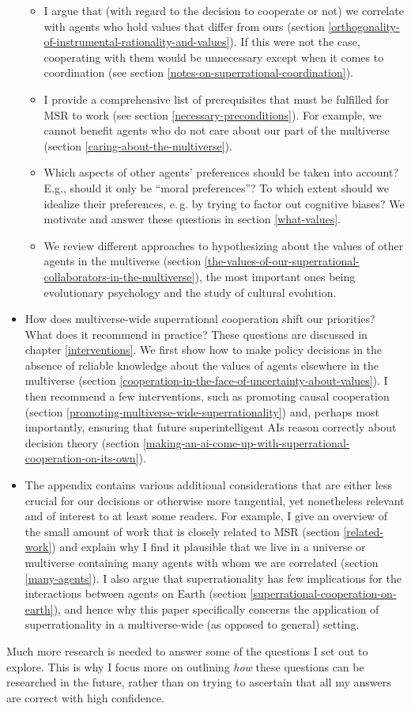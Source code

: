 \begin{itemize}
  \begin{itemize}
  \item
    I argue that (with regard to the decision to cooperate or not) we
    correlate with agents who hold values that differ from ours (section
    \ref{orthogonality-of-instrumental-rationality-and-values}). If this were not the
    case, cooperating with them would be unnecessary except when it
    comes to coordination (see section
    \ref{notes-on-superrational-coordination}).
  \item
    I provide a comprehensive list of prerequisites that must be
    fulfilled for MSR to work (see section
    \ref{necessary-preconditions}).
    For example, we cannot benefit agents who do not care about our part
    of the multiverse (section
    \ref{caring-about-the-multiverse}).
  \item
    Which aspects of other agents' preferences should be taken into
    account? E.g., should it only be ``moral preferences''? To which
    extent should we idealize their preferences, e.\,g. by trying to
    factor out cognitive biases? We motivate and answer these questions
    in section \ref{what-values}.
  \item
    We review different approaches to hypothesizing about the values of
    other agents in the multiverse (section
    \ref{the-values-of-our-superrational-collaborators-in-the-multiverse}),
    the most important ones being evolutionary psychology and the study
    of cultural evolution.
  \end{itemize}
\item
  How does multiverse-wide superrational cooperation shift our
  priorities? What does it recommend in practice? These questions are
  discussed in chapter
  \ref{interventions}. We first
  show how to make policy decisions in the absence of reliable knowledge
  about the values of agents elsewhere in the multiverse (section
  \ref{cooperation-in-the-face-of-uncertainty-about-values}). I then
  recommend a few interventions, such as promoting causal cooperation
  (section \ref{promoting-multiverse-wide-superrationality}) and, perhaps most importantly,
  ensuring that future superintelligent AIs reason correctly about
  decision theory (section
  \ref{making-an-ai-come-up-with-superrational-cooperation-on-its-own}).
\item
  The appendix contains various additional considerations that are
  either less crucial for our decisions or otherwise more tangential,
  yet nonetheless relevant and of interest to at least some readers. For
  example, I give an overview of the small amount of work that is
  closely related to MSR (section
  \ref{related-work}) and explain
  why I find it plausible that we live in a universe or multiverse
  containing many agents with whom we are correlated (section
  \ref{many-agents}). I also argue
  that superrationality has few implications for the interactions
  between agents on Earth (section
  \ref{superrational-cooperation-on-earth}), and hence why this paper specifically
  concerns the application of superrationality in a multiverse-wide (as
  opposed to general) setting.
\end{itemize}

Much more research is needed to answer some of the questions I set out
to explore. This is why I focus more on outlining \emph{how} these
questions can be researched in the future, rather than on trying to
ascertain that all my answers are correct with high confidence.

